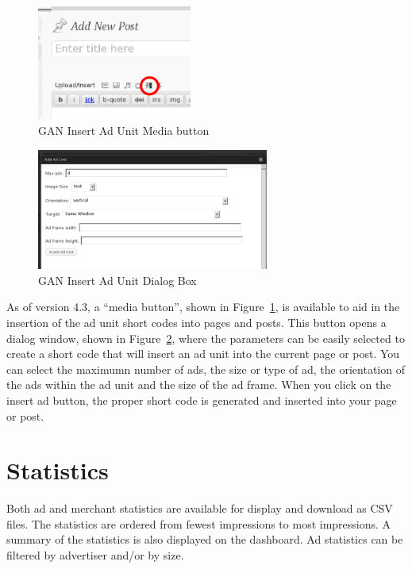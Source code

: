 \documentclass[letterpaper]{article}
\begin{document}
\begin{figure}[ht]
\begin{centering}
\includegraphics[width=2in]{ganmediabutton.png}
\caption{GAN Insert Ad Unit Media button}
\label{fig:ganmediabutton}
\end{centering}
\end{figure}
\begin{figure}[ht]
\begin{centering}
\includegraphics[width=3in]{ganinsertaddialog.png}
\caption{GAN Insert Ad Unit Dialog Box}
\label{fig:ganinsertaddialog}
\end{centering}
\end{figure}
As of version 4.3, a ``media button'', shown in
Figure~\ref{fig:ganmediabutton}, is available to aid in the insertion
of the ad unit short codes into pages and posts.  This button opens a
dialog window, shown in Figure~\ref{fig:ganinsertaddialog}, where the
parameters can be easily selected to create a short code that will
insert an ad unit into the current page or post. You can select the
maximumn number of ads, the size or type of ad, the orientation of the
ads within the ad unit and the size of the ad frame. When you click on
the insert ad button, the proper short code is generated and inserted
into your page or post.

\section{Statistics}

Both ad and merchant statistics are available for display and download
as CSV files.  The statistics are ordered from fewest impressions to
most impressions. A summary of the statistics is also displayed on the
dashboard.  Ad statistics can be filtered by advertiser and/or by size.
\end{document}
